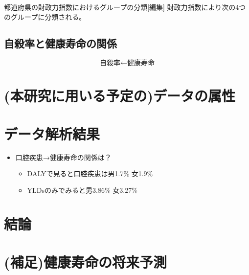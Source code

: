 

都道府県の財政力指数におけるグループの分類[編集]
財政力指数により次の4つのグループに分類される。

\section{自殺率と健康寿命の関係}

$$ \mbox{自殺率} \leftarrow \mbox{健康寿命}$$


\chapter{(本研究に用いる予定の)データの属性}
\chapter{データ解析結果}

\begin{itemize} \setlength{\itemsep}{-0.5mm} \setlength{\parskip}{-0.5mm}
	\item 口腔疾患→健康寿命の関係は？
	      \begin{itemize} \setlength{\itemsep}{-0.5mm} \setlength{\parskip}{-0.5mm}
		      \item DALYで見ると口腔疾患は男1.7\% 女1.9\%
		      \item YLDsのみでみると男3.86\% 女3.27\%
	      \end{itemize}
\end{itemize}

\chapter{結論}

\chapter{(補足)健康寿命の将来予測}

